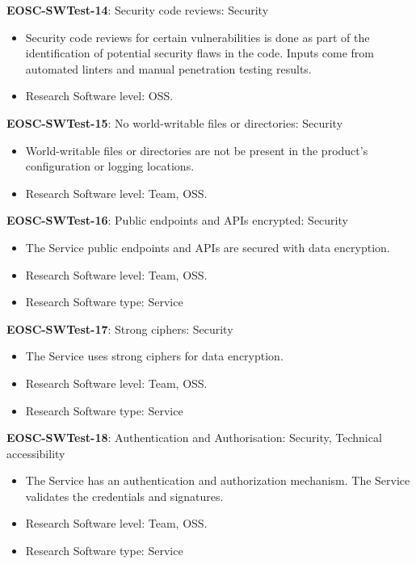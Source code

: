 \textbf{EOSC-SWTest-14}: Security code reviews: Security

\begin{itemize}
    \item Security code reviews for certain vulnerabilities is done as part of the identification of potential security flaws in the code. Inputs  come from automated linters and manual penetration testing results.~\cite{gillies_modelling_1992,shepherdson_cessda_2019,orviz_set_2017}
    \item Research Software level: OSS.
\end{itemize}

\textbf{EOSC-SWTest-15}: No world-writable files or directories: Security

\begin{itemize}
    \item World-writable files or directories are not be present in the product's configuration or logging locations.~\cite{orviz_set_2017}
    \item Research Software level: Team, OSS.
\end{itemize}

\textbf{EOSC-SWTest-16}: Public endpoints and APIs encrypted: Security

\begin{itemize}
    \item The Service public endpoints and APIs are secured with data encryption.~\cite{orviz_fernandez_eosc-synergy_2020}
    \item Research Software level: Team, OSS.
    \item Research Software type: Service
\end{itemize}

\textbf{EOSC-SWTest-17}: Strong ciphers: Security

\begin{itemize}
    \item The Service uses strong ciphers for data encryption.~\cite{orviz_fernandez_eosc-synergy_2020}
    \item Research Software level: Team, OSS.
    \item Research Software type: Service
\end{itemize}

\textbf{EOSC-SWTest-18}: Authentication and Authorisation: Security, Technical accessibility

\begin{itemize}
    \item The Service has an authentication and authorization mechanism. The Service validates the credentials and signatures.~\cite{shepherdson_cessda_2019,orviz_fernandez_eosc-synergy_2020}
    \item Research Software level: Team, OSS.
    \item Research Software type: Service
\end{itemize}

